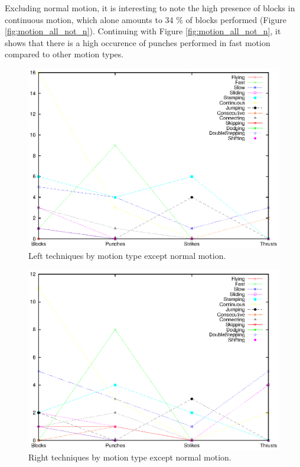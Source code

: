 \documentclass[10pt,twocolumn,a4paper]{article}
\begin{document}
  Excluding normal motion, it is interesting to note the high presence of
  blocks in continuous motion, which alone amounts to 34 \% of blocks
  performed (Figure \ref{fig:motion_all_not_n}). Continuing with Figure
  \ref{fig:motion_all_not_n}, it shows that there is a high occurence of
  punches performed in fast motion compared to other motion types.

  \begin{figure}
    \includegraphics[scale=0.65]{data/gnuplot/eps/motion_left_not_n}
    \caption{Left techniques by motion type except normal motion.}
    \label{fig:motion_left_not_n}
  \end{figure}

  \begin{figure}
    \includegraphics[scale=0.65]{data/gnuplot/eps/motion_right_not_n}
    \caption{Right techniques by motion type except normal motion.}
    \label{fig:motion_right_not_n}
  \end{figure}
\end{document}
